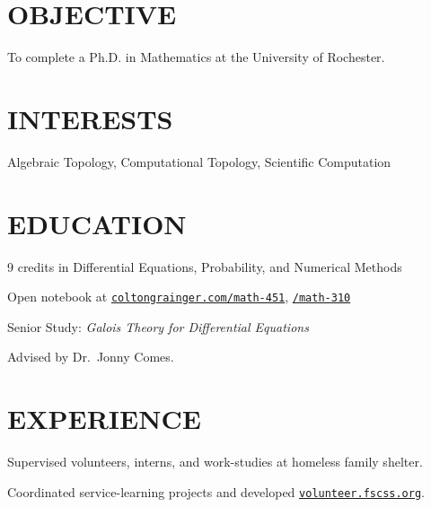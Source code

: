 \documentclass[margin]{res}
\begin{document}
\begin{resume}

\printheader
\section{OBJECTIVE}

To complete a Ph.D. in Mathematics at the University of Rochester.

\section{INTERESTS}

Algebraic Topology, Computational Topology, Scientific Computation 

\section{EDUCATION}

\begin{details}
\item 9 credits in Differential Equations, Probability, and Numerical Methods
\item Open notebook at \href{http://coltongrainger.com/math-451}{\texttt{coltongrainger.com/math-451}}, \href{http://coltongrainger.com/math-310}{\texttt{/math-310}}
\end{details}

\begin{details}
\item Senior Study: \emph{Galois Theory for Differential Equations}
\item Advised by Dr.~Jonny Comes.
\end{details}

\section{EXPERIENCE}

\begin{details}
\item{Supervised volunteers, interns, and work-studies at homeless family shelter.}
\item{Coordinated service-learning projects and developed \href{http://volunteer.fscss.org}{\texttt{volunteer.fscss.org}}.}
\end{details}


\end{resume}
\end{document}
